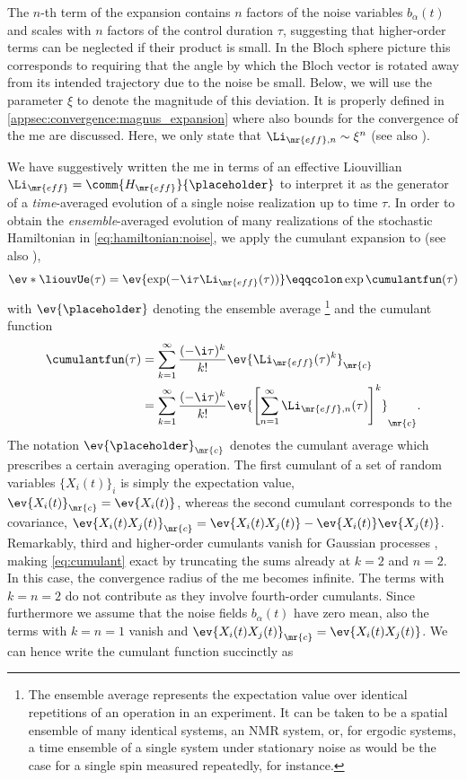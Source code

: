 The $n$-th term of the expansion contains $n$ factors of the noise variables $b_\alpha(t)$ and scales with $n$ factors of the control duration $\tau$, suggesting that higher-order terms can be neglected if their product is small. In the Bloch sphere picture this corresponds to requiring that the angle by which the Bloch vector is rotated away from its intended trajectory due to the noise be small. Below, we will use the parameter $\xi$ to denote the magnitude of this deviation. It is properly defined in \cref{appsec:convergence:magnus_expansion} where also bounds for the convergence of the \gls{me} are discussed. Here, we only state that $\Li_{\mr{eff},n}\sim\xi^n$ (see also ).

We have suggestively written the \gls{me} in terms of an effective Liouvillian $\Li_\mr{eff} = \comm{H_\mr{eff}}{\placeholder}$ to interpret it as the generator of a \emph{time}-averaged evolution of a single noise realization up to time $\tau$. In order to obtain the \emph{ensemble}-averaged evolution of many realizations of the stochastic Hamiltonian in \cref{eq:hamiltonian:noise}, we apply the cumulant expansion to \liouvUe (see also ),
\begin{equation}\label{eq:cumulant_expansion}
    \ev*{\liouvUe(\tau)} = \ev{\exp(-\i\tau\Li_\mr{eff}(\tau))} \eqqcolon \exp\cumulantfun(\tau)
\end{equation}
with $\ev{\placeholder}$ denoting the ensemble average \footnote{
The ensemble average represents the expectation value over identical repetitions of an operation in an experiment. It can be taken to be a spatial ensemble of many identical systems, \eg an NMR system, or, for ergodic systems, a time ensemble of a single system under stationary noise as would be the case for a single spin measured repeatedly, for instance.
} and the cumulant function \cite{Kubo1962}
\begin{align}
    \cumulantfun(\tau) &= \sum_{k=1}^\infty\frac{(-\i\tau)^k}{k!}\ev{\Li_\mr{eff}(\tau)^k}_\mr{c} \\
                       &= \sum_{k=1}^\infty\frac{(-\i\tau)^k}{k!}\ev{\left[\sum_{n=1}^\infty \Li_{\mr{eff},n}(\tau)\right]^k}_\mr{c}. \label{eq:cumulant}
\end{align}
The notation $\ev{\placeholder}_\mr{c}$ denotes the cumulant average which prescribes a certain averaging operation. The first cumulant of a set of random variables $\{X_i(t)\}_i$ is simply the expectation value, $\ev{X_i(t)}_\mr{c} = \ev{X_i(t)}$, whereas the second cumulant corresponds to the covariance, $\ev{X_i(t)X_j(t)}_\mr{c} = \ev{X_i(t)X_j(t)} - \ev{X_i(t)}\ev{X_j(t)}$. Remarkably, third and higher-order cumulants vanish for Gaussian processes \cite{Kubo1963,Szankowski2017}, making \cref{eq:cumulant} exact by truncating the sums already at $k = 2$ and $n = 2$. In this case, the convergence radius of the \gls{me} becomes infinite. The terms with $k = n = 2$ do not contribute as they involve fourth-order cumulants. Since furthermore we assume that the noise fields $b_\alpha(t)$ have zero mean, also the terms with $k = n = 1$ vanish and $\ev{X_i(t)X_j(t)}_\mr{c}  =  \ev{X_i(t)X_j(t)}$. We can hence write the cumulant function succinctly as

